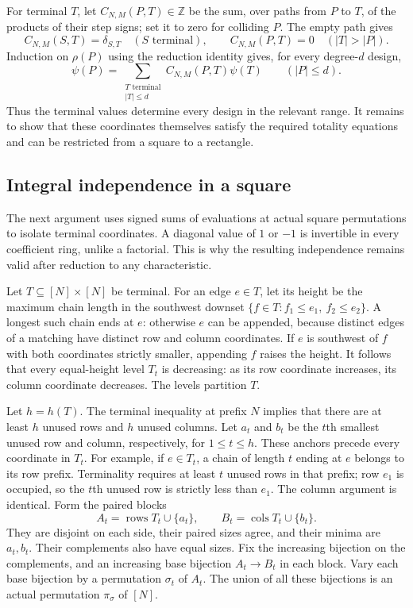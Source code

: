 \documentclass[11pt,a4paper]{article}
\theoremstyle{definition}\newtheorem{definition}[theorem]{Definition}
\theoremstyle{remark}\newtheorem{remark}[theorem]{Remark}
\begin{document}
For terminal $T$, let $C_{N,M}(P,T)\in\mathbb Z$ be the sum, over paths
from $P$ to $T$, of the products of their step signs; set it to zero for
colliding $P$.  The empty path gives
\[
 C_{N,M}(S,T)=\delta_{S,T}\quad(S\text{ terminal}),\qquad
 C_{N,M}(P,T)=0\quad(|T|>|P|).
\]
Induction on $\rho(P)$ using the reduction identity gives, for every
degree-$d$ design,
\begin{equation}\label{eq:terminal-expansion}
 \psi(P)=\sum_{\substack{T\text{ terminal}\\|T|\leq d}}
              C_{N,M}(P,T)\psi(T)\qquad(|P|\leq d).
\end{equation}
Thus the terminal values determine every design in the relevant range.
It remains to show that these coordinates themselves satisfy the required
totality equations and can be restricted from a square to a rectangle.

\subsection{Integral independence in a square}
The next argument uses signed sums of evaluations at actual square
permutations to isolate terminal coordinates. A diagonal value of
$1$ or $-1$ is invertible in every coefficient ring, unlike a factorial.
This is why the resulting independence remains valid after reduction
to any characteristic.

Let $T\subseteq[N]\times[N]$ be terminal.  For an edge $e\in T$, let
its height be the maximum chain length in the southwest downset
$\{f\in T:f_1\leq e_1,\ f_2\leq e_2\}$.  A longest such chain ends
at $e$: otherwise $e$ can be appended, because distinct edges of a
matching have distinct row and column coordinates.  If $e$ is southwest
of $f$ with both coordinates strictly smaller, appending $f$ raises the
height.  It follows that every equal-height level $T_t$ is decreasing:
as its row coordinate increases, its column coordinate decreases.
The levels partition $T$.

Let $h=h(T)$.  The terminal inequality at prefix $N$ implies that there
are at least $h$ unused rows and $h$ unused columns.  Let $a_t$ and $b_t$
be the $t$th smallest unused row and column, respectively, for
$1\leq t\leq h$.  These anchors precede every coordinate in $T_t$.
For example, if $e\in T_t$, a chain of length $t$ ending at $e$ belongs
to its row prefix.  Terminality requires at least $t$ unused rows in
that prefix; row $e_1$ is occupied, so the $t$th unused row is strictly
less than $e_1$.  The column argument is identical.  Form the paired blocks
\[
 A_t=\operatorname{rows}T_t\cup\{a_t\},\qquad
 B_t=\operatorname{cols}T_t\cup\{b_t\}.
\]
They are disjoint on each side, their paired sizes agree, and their
minima are $a_t,b_t$.  Their complements also have equal sizes.  Fix the
increasing bijection on the complements, and an increasing base bijection
$A_t\to B_t$ in each block.  Vary each base bijection by a permutation
$\sigma_t$ of $A_t$.  The union of all these bijections is an actual
permutation $\pi_\sigma$ of $[N]$.
\end{document}
